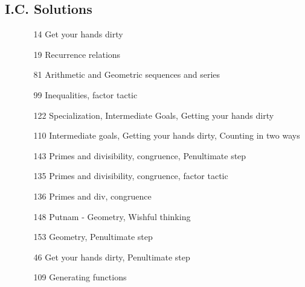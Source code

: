 \documentclass[11pt]{article}
\begin{document}
\subsection{I.C. Solutions}
\begin{itemize}
    \item[\text{Oct 4 Sub. }]  \begin{itemize}
        \item[14] Get your hands dirty
        \item[19] Recurrence relations
    \end{itemize}
    \item[\text{Nov 1 Sub. }] \begin{itemize}
        \item[81] Arithmetic and Geometric sequences and series
        \item[99] Inequalities, factor tactic
    \end{itemize}
    \item[\text{Nov 8 Sub. }]  \begin{itemize}
        \item[122] Specialization, Intermediate Goals, Getting your hands dirty
        \item[110] Intermediate goals, Getting your hands dirty, Counting in two ways
    \end{itemize}
    \item[\text{Nov 15 Sub. }] \begin{itemize}
        \item[143] Primes and divisibility, congruence, Penultimate step
    \end{itemize}
    \item[\text{Nov 19 ReSub. }] \begin{itemize}
        \item[135] Primes and divisibility, congruence, factor tactic
        \item[136] Primes and div, congruence
    \end{itemize}
    \item[\text{Nov 22 Sub. }] \begin{itemize}
        \item[148] Putnam - Geometry, Wishful thinking
        \item[153] Geometry, Penultimate step
    \end{itemize}
    \item[\text{Dec 3 ReSub. }]\begin{itemize}
        \item[46] Get your hands dirty, Penultimate step
        \item[109] Generating functions
    \end{itemize}

\end{itemize}
\end{document}
